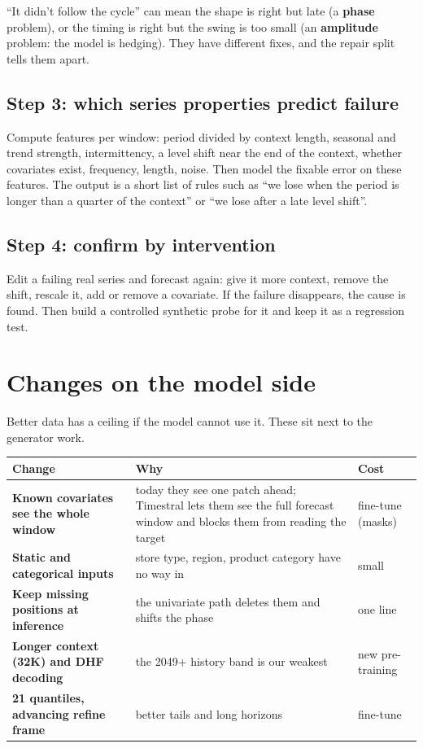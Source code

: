\documentclass[10pt,a4paper]{article}
\begin{document}
\begin{plain}
``It didn't follow the cycle'' can mean the shape is right but late (a \textbf{phase} problem), or the timing is right but the swing is too small (an \textbf{amplitude} problem: the model is hedging). They have different fixes, and the repair split tells them apart.
\end{plain}

\subsection{Step 3: which series properties predict failure}
Compute features per window: period divided by context length, seasonal and trend strength, intermittency, a level shift near the end of the context, whether covariates exist, frequency, length, noise. Then model the fixable error on these features. The output is a short list of rules such as ``we lose when the period is longer than a quarter of the context'' or ``we lose after a late level shift''.

\subsection{Step 4: confirm by intervention}
Edit a failing real series and forecast again: give it more context, remove the shift, rescale it, add or remove a covariate. If the failure disappears, the cause is found. Then build a controlled synthetic probe for it and keep it as a regression test.

\section{Changes on the model side}

Better data has a ceiling if the model cannot use it. These sit next to the generator work.

\begin{table}[H]
\centering\small
\begin{tabularx}{\linewidth}{>{\raggedright\arraybackslash\bfseries}p{4.2cm} Y l}
\toprule
Change & Why & Cost \\
\midrule
Known covariates see the whole window & today they see one patch ahead; Timestral lets them see the full forecast window and blocks them from reading the target & fine-tune (masks) \\
Static and categorical inputs & store type, region, product category have no way in & small \\
Keep missing positions at inference & the univariate path deletes them and shifts the phase & one line \\
Longer context (32K) and DHF decoding & the 2049+ history band is our weakest & new pre-training \\
21 quantiles, advancing refine frame & better tails and long horizons & fine-tune \\
\bottomrule
\end{tabularx}
\end{table}
\end{document}
